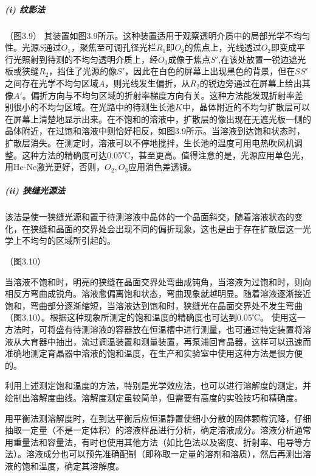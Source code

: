 \subparagraph{(i) 纹影法}
（图3.9）
其装置如图3.9所示。这种装置适用于观察透明介质中的局部光学不均匀性。光源$S$通过$O_1$，聚焦至可调孔径光栏$R_1$即$O_2$的焦点上，光线透过$O_2$即变成平行光照射到待测的不均匀透明介质上，经$O_3$成像于焦点$S'$,在该处放置一锐边遮光板或狭缝$R_2$，挡住了光源的像$S'$，因此在白色的屏幕上出现黑色的背景，但在$SS'$之间存在光学不均匀区域$A$，则光线发生偏折，从$R_2$的锐边旁通过在屏幕上给出其像$A'$。偏折方向与不均匀区域的折射率梯度方向有关。这种方法能发现折射率差别很小的不均匀区域。在光路中的待测生长池$K$中，晶体附近的不均匀扩散层可以在屏幕上清楚地显示出来。在不饱和的溶液中，扩散层的像出现在无遮光板一侧的晶体附近，在过饱和溶液中则恰好相反，如图3.9所示。当溶液到达饱和状态时，扩散层消失。在测定时，溶液可以不停地搅拌，生长池的温度可用电热吹风机调整。这种方法的精确度可达0.05℃，甚至更高。值得注意的是，光源应用单色光，用He-Ne激光更好，否则，$O_2,O_3$应用消色差透镜。

\subparagraph{(ii) 狭缝光源法}
该法是使一狭缝光源和置于待测溶液中晶体的一个晶面斜交，随着溶液状态的变化，在狭缝和晶面的交界处会出现不同的偏折现象，这也是由于存在扩散层这一光学上不均匀的区域所引起的。

（图3.10）

当溶液不饱和时，明亮的狭缝在晶面交界处弯曲成钝角，当溶液为过饱和时，则向相反方弯曲成锐角。溶液愈偏离饱和状态，弯曲现象就越明显。随着溶液逐淅接近饱和，弯曲部分逐渐缩短，当溶液达到饱和时，狭缝光在晶面交界处不发生弯曲（图3.10）。根据这种现象所测定的饱和温度的精确度也可达到0.05℃。 使用这一方法时，可将盛有待测溶液的容器放在恒温槽中进行测量，也可通过特定装置将溶液从大育器中抽出，流过调温装置和测量装置，再泵浦回育晶器，这样可以迅速而准确地测定育晶器中溶液的饱和温度，在生产和实验室中使用这种方法是很方便的。

利用上述测定饱和温度的方法，特别是光学效应法，也可以进行溶解度的测定，并绘制出溶解度曲线。溶解度测定虽较简单，但需要有高度的实验技巧和精确度。

用平衡法测溶解度时，在到达平衡后应恒温静置使细小分散的固体颗粒沉降，仔细抽取一定量（不是一定体积）的溶液样品进行分析，确定溶液成分。溶液分析通常用重量法和容量法，有时也使用其他方法（如比色法以及密度、折射率、电导等方法）。溶液成分也可以预先准确配制（即称取一定量的溶剂和溶质），然后再测出溶液的饱和温度，确定其溶解度。

